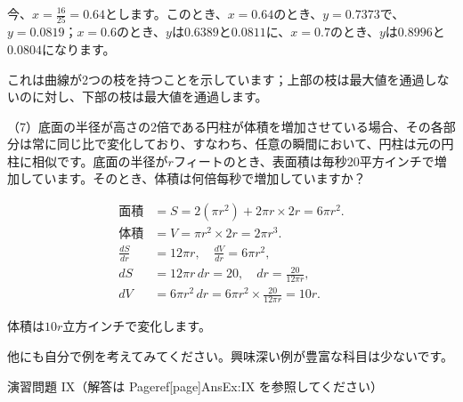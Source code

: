 \documentclass[a4paper,11pt,openany]{ltjsbook}
\begin{document}
今、$x = \frac{16}{25} = 0.64$とします。このとき、$x = 0.64$のとき、$y = 0.7373$で、$y = 0.0819$；$x = 0.6$のとき、$y$は$0.6389$と$0.0811$に、$x = 0.7$のとき、$y$は$0.8996$と$0.0804$になります。

これは曲線が2つの枝を持つことを示しています；上部の枝は最大値を通過しないのに対し、下部の枝は最大値を通過します。

（7）底面の半径が高さの2倍である円柱が体積を増加させている場合、その各部分は常に同じ比で変化しており、すなわち、任意の瞬間において、円柱は元の円柱に相似です。底面の半径が$r$フィートのとき、表面積は毎秒20平方インチで増加しています。そのとき、体積は何倍每秒で増加していますか？

\begin{align*}
\text{面積}   &= S = 2(\pi r^2) + 2 \pi r \times  2r = 6 \pi r^2.\\
\text{体積}    &= V = \pi r^2 \times  2r = 2 \pi r^3.\\
\frac{dS}{dr}   &= 12\pi r, \quad \frac{dV}{dr}=6 \pi r^2,\\
dS             &= 12\pi r\, dr=20, \quad dr=\frac{20}{12 \pi r},\\
dV             &=  6\pi r^2\, dr = 6 \pi r^2 \times  \frac{20}{12 \pi r} = 10r.
\end{align*}

体積は$10r$立方インチで変化します。

他にも自分で例を考えてみてください。興味深い例が豊富な科目は少ないです。

演習問題 IX（解答は Pageref[page]{AnsEx:IX} を参照してください）
\end{document}

